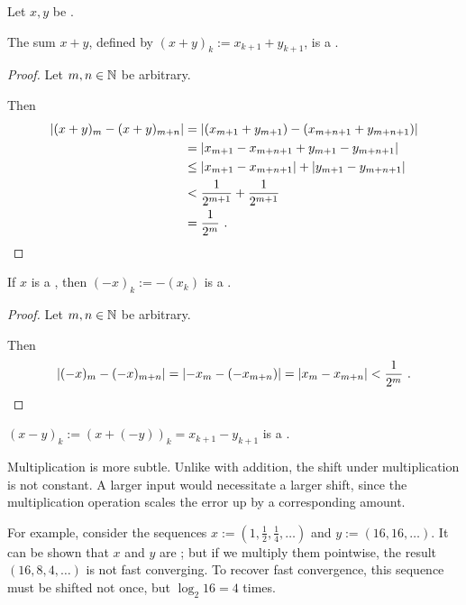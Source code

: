 \documentclass[leqno]{report}
\begin{document}
\begin{Proposition}[Addition]
    \label{add}
    Let $x, y$ be \FCCS.

    The sum $x + y$, defined by $(x+y)_k := x_{k+1} + y_{k+1}$, is a \FCCS.
\end{Proposition}

\begin{proof}
    Let $m, n \in \mathbb{N}$ be arbitrary.

    Then
    \begin{align*}
        \left| (x+y)_m - (x+y)_{m+n} \right|
        &= \left| (x_{m+1} + y_{m+1}) - (x_{m+n+1} + y_{m+n+1}) \right| \\
        &= \left| x_{m+1} - x_{m+n+1} + y_{m+1} - y_{m+n+1} \right| \\
        &\leq \left| x_{m+1} - x_{m+n+1} \right| + \left| y_{m+1} - y_{m+n+1} \right| \\
        &< \frac{1}{2^{m+1}} + \frac{1}{2^{m+1}} \\
        &= \frac{1}{2^m}
        \ . \qedhere
    \end{align*}
\end{proof}

\begin{Proposition}[Negation]
    \label{neg}
    If $x$ is a \FCCS, then $(-x)_k := -(x_k)$ is a \FCCS.
\end{Proposition}

\begin{proof}
    Let $m, n \in \mathbb{N}$ be arbitrary.

    Then
    \[
        \left| (-x)_m - (-x)_{m+n} \right|
        = \left| -x_m - (-x_{m+n}) \right|
        = \left| x_m - x_{m+n} \right|
        < \frac{1}{2^m}
        \ . \qedhere
    \]
\end{proof}

\begin{Corollary}[Subtraction]
    $(x - y)_k := (x + (-y))_k = x_{k+1} - y_{k+1}$ is a \FCCS.
\end{Corollary}

Multiplication is more subtle. Unlike with addition, the shift under multiplication is not constant. A larger input would necessitate a larger shift, since the multiplication operation scales the error up by a corresponding amount.

For example, consider the sequences $x := (1, \frac{1}{2}, \frac{1}{4}, \ldots)$ and $y := (16, 16, \ldots)$. It can be shown that $x$ and $y$ are \FCCS; but if we multiply them pointwise, the result $(16, 8, 4, \ldots)$ is not fast converging. To recover fast convergence, this sequence must be shifted not once, but $\log_2 16 = 4$ times.
\end{document}

